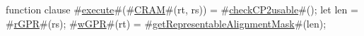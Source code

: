 function clause #\hyperref[zexecute]{execute}#(#\hyperref[zCRAM]{CRAM}#(rt, rs)) =
{
  #\hyperref[zcheckCP2usable]{checkCP2usable}#();
  let len = #\hyperref[zrGPR]{rGPR}#(rs);
  #\hyperref[zwGPR]{wGPR}#(rt) = #\hyperref[zgetRepresentableAlignmentMask]{getRepresentableAlignmentMask}#(len);
}
